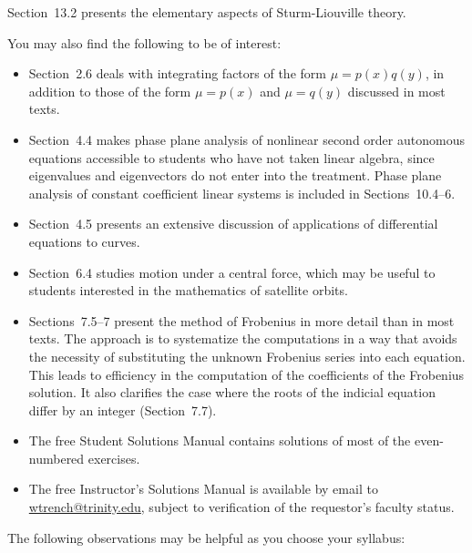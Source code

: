 Section~13.2 presents the elementary aspects of Sturm-Liouville theory.

You may also find the following to be of interest:

\begin{itemize}
  \item Section~2.6 deals with integrating factors of the form $\mu=p(x)q(y)$, in addition to those
        of the form $\mu=p(x)$ and $\mu=q(y)$ discussed in most texts.

  \item Section~4.4 makes phase plane analysis of nonlinear second order autonomous equations
        accessible to students who have not taken linear algebra, since eigenvalues and eigenvectors
        do not enter into the treatment. Phase plane analysis of constant coefficient linear systems
        is included in Sections~10.4--6.

  \item Section~4.5 presents an extensive discussion of applications of differential equations to
        curves.

  \item Section~6.4 studies motion under a central force, which may be useful to students interested
        in the mathematics of satellite orbits.

  \item Sections~7.5--7 present the method of Frobenius in more detail than in most texts. The
        approach is to systematize the computations in a way that avoids the necessity of
        substituting the unknown Frobenius series into each equation. This leads to efficiency in
        the computation of the coefficients of the Frobenius solution. It also clarifies the case
        where the roots of the indicial equation differ by an integer (Section~7.7).

  \item The free Student Solutions Manual contains solutions of most of the even-numbered exercises.

  \item The free Instructor's Solutions Manual is available by email to
        \href{mailto:wtrench@trinity.edu}{wtrench@trinity.edu}, subject to verification of the
        requestor's faculty status.
\end{itemize}

The following observations may be helpful as you choose your syllabus:

